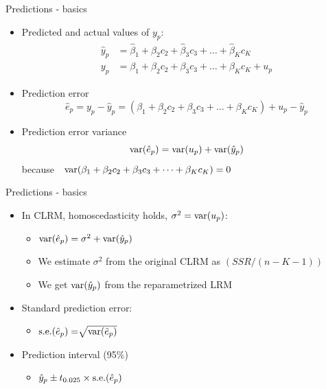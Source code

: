 \documentclass{beamer}
\begin{document}

\begin{frame}{Predictions - basics}
\begin{itemize}
\item Predicted and actual values of $y_p$:
\begin{align}\nonumber
\hat{y}_p &  = \hat{\beta}_1 + \hat{\beta}_2 c_2 + \hat{\beta}_3 c_3 + \dots + \hat{\beta}_K c_K\\ \nonumber
y_p & = \beta_1 + \beta_2 c_2 + \beta_3 c_3 + \dots+\beta_K c_K + u_p \nonumber
\end{align} 
\item Prediction error
$$\hat{e}_p = y_p - \hat{y}_p = (\beta_1 + \beta_2 c_2 + \beta_3 c_3 + \dots+\beta_K c_K) + u_p - \hat{y}_p$$
\item Prediction error variance
$$\textnormal{var}(\hat{e}_p) = \textnormal{var}(u_p) + \textnormal{var}(\hat{y}_p)$$
because~~$\textnormal{var}(\beta_1 + \beta_2 c_2 + \beta_3 c_3 + \dots+\beta_K c_K)=0$
\end{itemize}
\end{frame}


\begin{frame}{Predictions - basics}
\begin{itemize}
\item In CLRM, homoscedasticity holds, $\sigma^2 = \textnormal{var}(u_p)$: \\

\begin{itemize}
\item $\textnormal{var}(\hat{e}_p) = \sigma^2 + \textnormal{var}(\hat{y}_p)$
\vspace{0.2cm}
\item We estimate $\sigma^2$ from the original CLRM as $(\textit{SSR}/(n-K-1))$
\vspace{0.2cm}
\item We get $\textnormal{var}(\hat{y}_p)$ from the reparametrized LRM
\end{itemize}
\vspace{0.5cm}
\item Standard prediction error:
\begin{itemize}
\vspace{0.2cm}
 \item $\textnormal{s.e.}(\hat{e}_p) = \sqrt[]{\textnormal{var}(\hat{e}_p)}$
\end{itemize}
\vspace{0.5cm}
\item Prediction interval (95\%)
\vspace{0.2cm}
\begin{itemize}
\item $\hat{y}_p \pm t_{0.025} \times \textnormal{s.e.}(\hat{e}_p) $
\end{itemize}
\end{itemize}
\end{frame}
\end{document}
